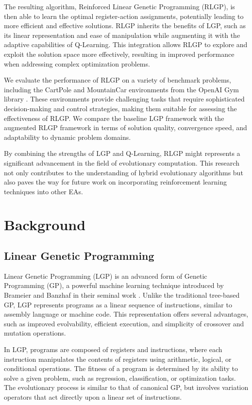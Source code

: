 \documentclass[12pt, final]{dalcsthesis}
\begin{document}
The resulting algorithm, Reinforced Linear Genetic Programming (RLGP), is then able to learn the optimal register-action assignments, potentially leading to more efficient and effective solutions. RLGP inherits the benefits of LGP, such as its linear representation and ease of manipulation while augmenting it with the adaptive capabilities of Q-Learning. This integration allows RLGP to explore and exploit the solution space more effectively, resulting in improved performance when addressing complex optimization problems.

We evaluate the performance of RLGP on a variety of benchmark problems, including the CartPole and MountainCar environments from the OpenAI Gym library \cite{1606.01540}. These environments provide challenging tasks that require sophisticated decision-making and control strategies, making them suitable for assessing the effectiveness of RLGP. We compare the baseline LGP framework with the augmented RLGP framework in terms of solution quality, convergence speed, and adaptability to dynamic problem domains.

By combining the strengths of LGP and Q-Learning, RLGP might represents a significant advancement in the field of evolutionary computation. This research not only contributes to the understanding of hybrid evolutionary algorithms but also paves the way for future work on incorporating reinforcement learning techniques into other EAs.

\chapter{Background}
\section{Linear Genetic Programming}
Linear Genetic Programming (LGP) is an advanced form of Genetic Programming (GP), a powerful machine learning technique introduced by Brameier and Banzhaf in their seminal work \cite{brameier2001comparison}. Unlike the traditional tree-based GP, LGP represents programs as a linear sequence of instructions, similar to assembly language or machine code. This representation offers several advantages, such as improved evolvability, efficient execution, and simplicity of crossover and mutation operations.

In LGP, programs are composed of registers and instructions, where each instruction manipulates the contents of registers using arithmetic, logical, or conditional operations. The fitness of a program is determined by its ability to solve a given problem, such as regression, classification, or optimization tasks. The evolutionary process is similar to that of canonical GP, but involves variation operators that act directly upon a linear set of instructions.
\end{document}
